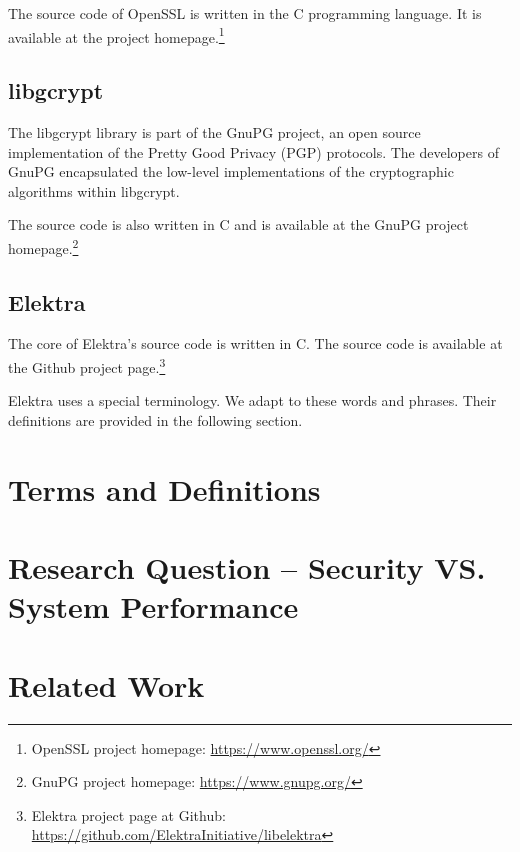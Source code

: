 The source code of OpenSSL is written in the C programming language.
It is available at the project homepage.\footnote{OpenSSL project homepage: \url{https://www.openssl.org/}}

	\subsection{libgcrypt}

The libgcrypt library is part of the GnuPG project, an open source implementation of the Pretty Good Privacy (PGP) protocols.
The developers of GnuPG encapsulated the low-level implementations of the cryptographic algorithms within libgcrypt.

The source code is also written in C and is available at the GnuPG project homepage.\footnote{GnuPG project homepage: \url{https://www.gnupg.org/}}

	\subsection{Elektra}

The core of Elektra's source code is written in C.
The source code is available at the Github project page.\footnote{Elektra project page at Github: \url{https://github.com/ElektraInitiative/libelektra}}

Elektra uses a special terminology.
We adapt to these words and phrases.
Their definitions are provided in the following section.

\section{Terms and Definitions}

\section{Research Question -- Security VS. System Performance}

\section{Related Work}
